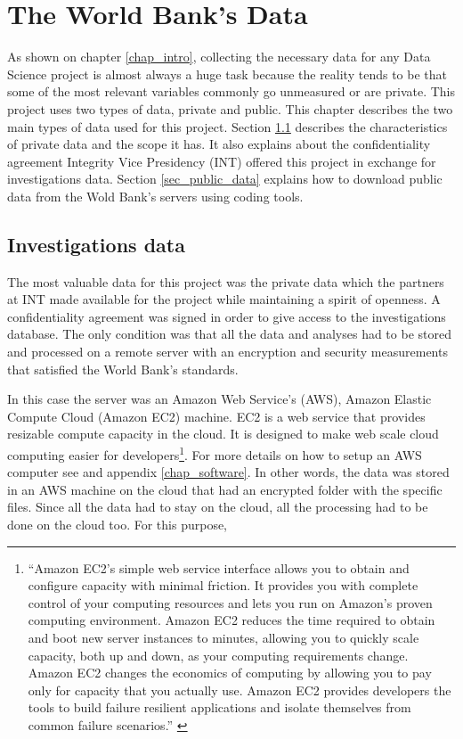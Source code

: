 \chapter{The World Bank's Data}\label{chap_data}

As shown on chapter \ref{chap_intro}, collecting the necessary data for any Data Science project is almost always a huge task because the reality tends to be that some of the most relevant variables commonly go unmeasured or are private. This project uses  two types of data, private and public. This chapter describes the two main types of data used for this project.
Section \ref{sec_inv_data} describes the characteristics of private data and the scope it has. It also explains about the confidentiality agreement Integrity Vice Presidency (INT) offered this project in exchange for investigations data. Section \ref{sec_public_data} explains how to download public data from the Wold Bank's servers using coding tools.

\section{Investigations data}\label{sec_inv_data}

The most valuable data for this project was the private data which the partners at INT made available for the project while maintaining a spirit of openness. A confidentiality agreement was signed in order to give access to the investigations database. The only condition was that all the data and analyses had to be stored and processed on a remote server with an encryption and security measurements that satisfied the World Bank's standards. 

In this case the server was an Amazon Web Service's (AWS), Amazon Elastic Compute Cloud (Amazon EC2) machine. EC2 is a web service that provides resizable compute capacity in the cloud. It is designed to make web scale cloud computing easier for developers\footnote{``Amazon EC2’s simple web service interface allows you to obtain and configure capacity with minimal friction. It provides you with complete control of your computing resources and lets you run on Amazon’s proven computing environment. Amazon EC2 reduces the time required to obtain and boot new server instances to minutes, allowing you to quickly scale capacity, both up and down, as your computing requirements change. Amazon EC2 changes the economics of computing by allowing you to pay only for capacity that you actually use. Amazon EC2 provides developers the tools to build failure resilient applications and isolate themselves from common failure scenarios.'' \parencite{aws_es2}}. For more details on how to setup an AWS computer see \parencite{aws_start} and appendix \ref{chap_software}. In other words, the data was stored in an AWS machine on the cloud that had an encrypted folder with the specific files. Since all the data had to stay on the cloud, all the processing had to be done on the cloud too. For this purpose, 


